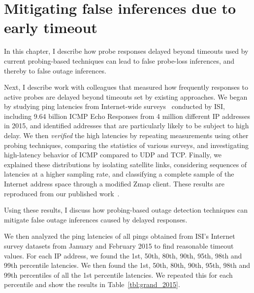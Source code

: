 
\chapter{Mitigating false inferences due to early timeout}
\label{cpt:timeouts}

In this chapter, I describe how probe responses delayed beyond
timeouts used by current probing-based techniques can lead to false
probe-loss inferences, and thereby to false outage inferences. 

Next, I describe work with colleagues that measured how frequently responses
to active probes are delayed beyond timeouts set by existing
approaches. We began by studying ping latencies from Internet-wide surveys~\cite{census-survey} conducted by ISI,
including 9.64 billion ICMP Echo Responses from 4 million different IP
addresses in 2015, and identified addresses that are particularly likely
to be subject to high delay.  We then \emph{verified} the high latencies
by repeating measurements using other probing techniques, comparing the
statistics of various surveys, and investigating high-latency
behavior of ICMP compared to UDP and TCP.  Finally, we
explained these distributions by isolating satellite links,
considering sequences of latencies at a higher sampling rate,
and classifying a complete sample of the Internet address
space through a modified Zmap client. These results are reproduced
from our published work~\cite{timeouts}.

Using these results, I discuss how probing-based outage
detection techniques can mitigate false outage inferences caused by
delayed responses.


We then analyzed the ping latencies of all pings obtained
from ISI's Internet survey datasets from January and February 2015 to find reasonable timeout values. For each IP address, we found the 1st, 50th, 80th,
90th, 95th, 98th and 99th percentile latencies. We then found the 1st, 50th,
80th, 90th, 95th, 98th and 99th percentiles of all the 1st percentile latencies. We repeated this for each
percentile and show the results in Table~\ref{tbl:grand_2015}.

